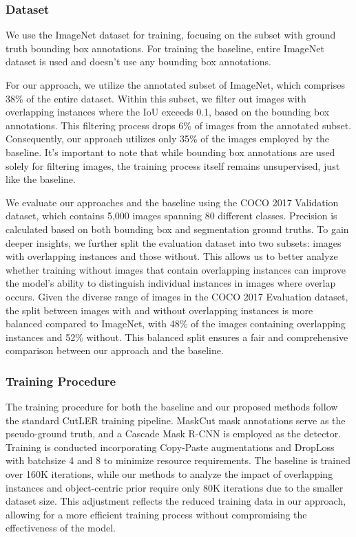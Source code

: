 \subsubsection{Dataset}
We use the ImageNet dataset for training, focusing on the subset with ground truth bounding box annotations. For training the baseline, entire ImageNet dataset is used and doesn't use any bounding box annotations. 

For our approach, we utilize the annotated subset of ImageNet, which comprises 38\% of the entire dataset. Within this subset, we filter out images with overlapping instances where the IoU exceeds 0.1, based on the bounding box annotations. This filtering process drops 6\% of images from the annotated subset. Consequently, our approach utilizes only 35\% of the images employed by the baseline. It's important to note that while bounding box annotations are used solely for filtering images, the training process itself remains unsupervised, just like the baseline.

We evaluate our approaches and the baseline using the COCO 2017 Validation dataset, which contains 5,000 images spanning 80 different classes. Precision is calculated based on both bounding box and segmentation ground truths. To gain deeper insights, we further split the evaluation dataset into two subsets: images with overlapping instances and those without. This allows us to better analyze whether training without images that contain overlapping instances can improve the model's ability to distinguish individual instances in images where overlap occurs. Given the diverse range of images in the COCO 2017 Evaluation dataset, the split between images with and without overlapping instances is more balanced compared to ImageNet, with 48\% of the images containing overlapping instances and 52\% without. This balanced split ensures a fair and comprehensive comparison between our approach and the baseline.

\subsubsection{Training Procedure}
The training procedure for both the baseline and our proposed methods follow the standard CutLER training pipeline. MaskCut mask annotations serve as the pseudo-ground truth, and a Cascade Mask R-CNN is employed as the detector. Training is conducted incorporating Copy-Paste augmentations and DropLoss with batchsize 4 and 8 to minimize resource requirements. The baseline is trained over 160K iterations, while our methods to analyze the impact of overlapping instances and object-centric prior require only 80K iterations due to the smaller dataset size. This adjustment reflects the reduced training data in our approach, allowing for a more efficient training process without compromising the effectiveness of the model.

